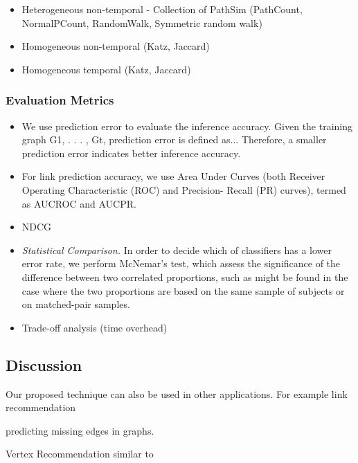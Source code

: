 \begin{itemize}
    \item  Heterogeneous non-temporal - Collection of PathSim (PathCount, NormalPCount, RandomWalk, Symmetric random walk)
    \item  Homogeneous non-temporal (Katz, Jaccard)
    \item  Homogeneous temporal (Katz, Jaccard)
\end{itemize}

\subsubsection{Evaluation Metrics}

\begin{itemize}
    \item We use prediction error to evaluate the inference accuracy. Given the training graph G1, . . . , Gt, prediction error is defined as... Therefore, a smaller prediction error indicates better inference accuracy.
    
    \item For link prediction accuracy, we use Area Under Curves
(both Receiver Operating Characteristic (ROC) and Precision-
Recall (PR) curves), termed as AUCROC and AUCPR.

    \item NDCG
    
     \item \textit{Statistical Comparison.} In order to decide which of classifiers has a lower error rate, we perform McNemar's test, which assess the significance of the difference between two correlated proportions, such as might be found in the case where the two proportions are based on the same sample of subjects or on matched-pair samples.
   
    \item Trade-off analysis (time overhead)
    
\end{itemize}


\subsection{Discussion}

Our proposed technique can also be used in other applications. For example link recommendation 


predicting missing edges in graphs.

Vertex Recommendation similar to \cite{ou2016asymmetric} 



